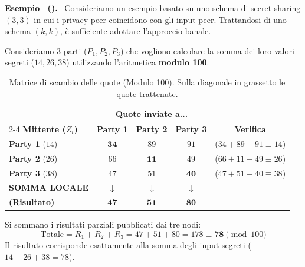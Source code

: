 \documentclass[a4paper, 11pt]{article}
\newenvironment{example}[1][]{
  \par\noindent\textbf{Esempio%
  \if\relax\detokenize{#1}\relax\else\ (\textbf{#1})\fi.}\ }{}
\begin{document}
\begin{example}
    Consideriamo un esempio basato su uno schema di secret sharing $(3,3)$ in cui i privacy peer coincidono con gli input peer. Trattandosi di uno schema $(k,k)$, è sufficiente adottare l'approccio banale.

    Consideriamo 3 parti ($P_1, P_2, P_3$) che vogliono calcolare la somma dei loro valori segreti ($14, 26, 38$) utilizzando l'aritmetica \textbf{modulo 100}.

    \begin{table}[h!]
        \centering
        \setlength{\tabcolsep}{4pt} 
        
        \begin{tabular}{l ccc c} 
            \toprule
            & \multicolumn{3}{c}{\textbf{Quote inviate a...}} & \\
            \cmidrule(lr){2-4}
            \textbf{Mittente ($Z_i$)} & \textbf{Party 1} & \textbf{Party 2} & \textbf{Party 3} & \textbf{Verifica} \\ 
            \midrule
            
            \textbf{Party 1} ($14$) & $\mathbf{34}$ & $89$ & $91$ & \footnotesize ($34+89+91 \equiv 14$) \\
            
            \textbf{Party 2} ($26$) & $66$ & $\mathbf{11}$ & $49$ & \footnotesize ($66+11+49 \equiv 26$) \\
            
            \textbf{Party 3} ($38$) & $47$ & $51$ & $\mathbf{40}$ & \footnotesize ($47+51+40 \equiv 38$) \\
            
            \midrule
            \textbf{SOMMA LOCALE} & $\downarrow$ & $\downarrow$ & $\downarrow$ & \\
            \textbf{(Risultato)} & $\mathbf{47}$ & $\mathbf{51}$ & $\mathbf{80}$ & \\
            \bottomrule
        \end{tabular}
        \caption{Matrice di scambio delle quote (Modulo 100). Sulla diagonale in grassetto le quote trattenute.}
    \end{table}
    
    Si sommano i risultati parziali pubblicati dai tre nodi:
    \[
    \text{Totale} = R_1 + R_2 + R_3 = 47 + 51 + 80 = 178 \equiv \mathbf{78} \pmod{100}
    \]
    Il risultato corrisponde esattamente alla somma degli input segreti ($14 + 26 + 38 = 78$).
\end{example}
\end{document}
